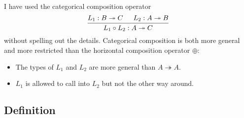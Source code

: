 \documentclass{article}
\begin{document}
I have used the categorical composition operator
\[
  \begin{prooftree}
    \hypo{L_1 : B \twoheadrightarrow C}
    \hypo{L_2 : A \twoheadrightarrow B}
    \infer2{L_1 \circ L_2 : A \twoheadrightarrow C}
  \end{prooftree}
\]
without spelling out the details.
Categorical composition is both
more general and more restricted
than the horizontal composition operator $\oplus$:
\begin{itemize}
  \item The types of $L_1$ and $L_2$
    are more general than $A \twoheadrightarrow A$.
  \item 
    $L_1$ is allowed to call into $L_2$
    but not the other way around.
\end{itemize}

\subsection{Definition} %
\end{document}
